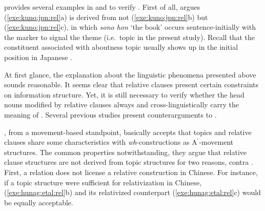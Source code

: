 

\noindent \citeauthor{kuno:76} provides several examples in
 and  to verify . First of all,
\citeauthor{kuno:76} argues (\ref{exe:kuno:jpn:rel}a) is derived from
not (\ref{exe:kuno:jpn:rel}b) but (\ref{exe:kuno:jpn:rel}c), in which
\textit{sono hon} `the book' occurs sentence-initially with the 
marker \wa to signal the theme (i.e.\ topic in the present study).
Recall that the constituent associated with aboutness topic usually
shows up in the initial position in Japanese
\citep{maki:etal:99,vermeulen:09}.




At first glance, the explanation about the linguistic phenomena
presented above sounds reasonable.  It seems clear that relative
clauses present certain constraints on information structure. Yet, it
is still necessary to verify whether the head nouns modified by
relative clauses always and cross-linguistically carry the meaning of
. Several previous studies present counterarguments to
.



\citet{huang:etal:09}, from a movement-based
standpoint, basically accepts that topics and relative clauses share
some characteristics with \textit{wh}-constructions as
A$^\ensuremath{\prime}$-movement structures. The common properties
notwithstanding, they argue that relative clause structures are not
derived from topic structures for two reasons, contra \citet{kuno:76}.
First, a  relation does not license a relative construction in
Chinese.  For instance, if a topic structure were sufficient for
relativization in Chinese, (\ref{exe:hunag:etal:rel}b) and its
relativized counterpart (\ref{exe:hunag:etal:rel}c) would be equally
acceptable.


